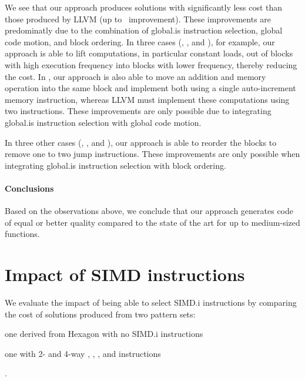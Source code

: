 We see that our approach produces \glspl{solution} with significantly less
cost than those produced by \gls{LLVM} (up to~\printSpeedup{%
  \UnisonVsLlvmHexagonFiveCyclesSpeedupCyclesZeroCenteredSpeedupMax%
} improvement).
%
These improvements are predominatly due to the combination of \gls{global.is}
\gls{instruction selection}, \gls{global code motion}, and \gls{block ordering}.
%
In three cases (, , and
), for example, our approach is able to lift computations, in
particular constant loads, out of \glspl{block} with high execution frequency
into \glspl{block} with lower frequency, thereby reducing the cost.
%
In , our approach is also able to move an addition and
memory \gls{operation} into the same \gls{block} and implement both using a
single auto-increment memory \gls{instruction}, whereas \gls{LLVM} must
implement these computations using two \glspl{instruction}.
%
These improvements are only possible due to integrating \gls{global.is}
\gls{instruction selection} with \gls{global code motion}.

In three other cases (, ,
and ), our approach is able to reorder the
\glspl{block} to remove one to two jump \glspl{instruction}.
%
These improvements are only possible when integrating \gls{global.is}
\gls{instruction selection} with \gls{block ordering}.


\paragraph{Conclusions}

Based on the observations above, we conclude that our approach generates code of
equal or better quality compared to the state of the art for up to medium-sized
\glspl{function}.



\section{Impact of SIMD instructions}

We evaluate the impact of being able to select \gls{SIMD.i} \glspl{instruction}
by comparing the cost of \glspl{solution} produced from two \glspl{pattern set}:
%
\begin{patternList}
  \item {}
    one derived from \gls{Hexagon} with no \gls{SIMD.i} \glspl{instruction}
  \item {}
    one with \num{2}- and \num{4}-way , , ,
    and  \glspl{instruction}
\end{patternList}.


